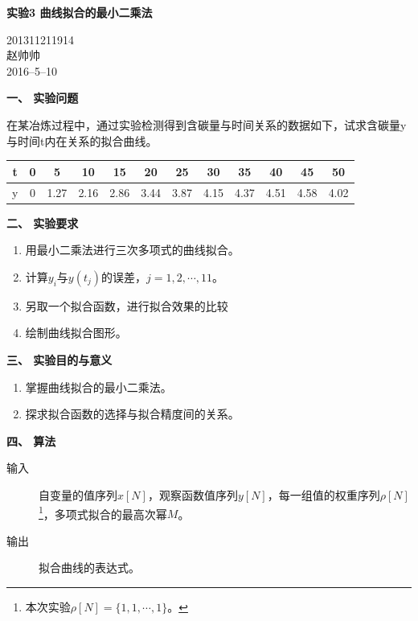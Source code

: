\documentclass[a4paper,11pt]{article}
\begin{document}
\begin{center}
	\huge{\textbf{实验3 曲线拟合的最小二乘法\\}}
\end{center}
\begin{flushright}
	201311211914\\
	赵帅帅\\
	2016--5--10\\
\end{flushright}
\begin{Large}
	\textbf{一、 实验问题}
\end{Large}

	在某冶炼过程中，通过实验检测得到含碳量与时间关系的数据如下，试求含碳量y与时间t内在关系的拟合曲线。
	\begin{center}
		\begin{tabular}{c|ccccccccccc}
			\hline
			t & 0 & 5 & 10 & 15 & 20 & 25 & 30 & 35 & 40 & 45 & 50 \\
			\hline
			y & 0 & 1.27 & 2.16 & 2.86 & 3.44 & 3.87 & 4.15 & 4.37 & 4.51 & 4.58 & 4.02 \\
			\hline
		\end{tabular}
	\end{center}
\begin{Large}
	\textbf{二、 实验要求}
\end{Large}
\begin{enumerate}
	\item 用最小二乘法进行三次多项式的曲线拟合。
	\item 计算$y_i$与$y(t_j)$的误差，$j=1,2,\cdots,11$。
	\item 另取一个拟合函数，进行拟合效果的比较
	\item 绘制曲线拟合图形。
\end{enumerate}
\begin{Large}
	\textbf{三、 实验目的与意义}
\end{Large}
\begin{enumerate}
	\item 掌握曲线拟合的最小二乘法。
	\item 探求拟合函数的选择与拟合精度间的关系。
\end{enumerate}
\begin{Large}
	\textbf{四、 算法}
\end{Large}
	\begin{description}
		\item[输入 ] 自变量的值序列$x[N]$，观察函数值序列$y[N]$，每一组值的权重序列$\rho[N]$\footnote{本次实验$\rho[N]=\{1,1,\cdots,1\}$。}，多项式拟合的最高次幂$M$。
		\item[输出 ] 拟合曲线的表达式。
	\end{description}
\end{document}
